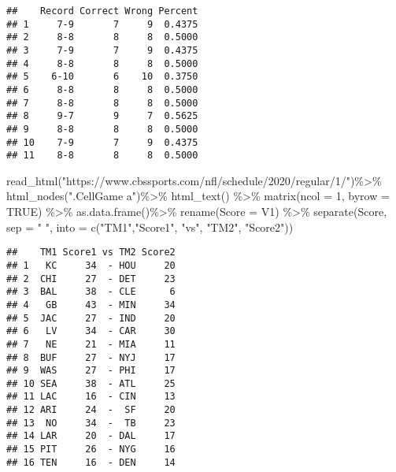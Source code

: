 \documentclass[
]{article}
\newenvironment{Shaded}{\begin{snugshade}}{\end{snugshade}}
\newcommand{\AttributeTok}[1]{\textcolor[rgb]{0.77,0.63,0.00}{#1}}
\newcommand{\ConstantTok}[1]{\textcolor[rgb]{0.00,0.00,0.00}{#1}}
\newcommand{\DecValTok}[1]{\textcolor[rgb]{0.00,0.00,0.81}{#1}}
\newcommand{\FunctionTok}[1]{\textcolor[rgb]{0.00,0.00,0.00}{#1}}
\newcommand{\NormalTok}[1]{#1}
\newcommand{\OtherTok}[1]{\textcolor[rgb]{0.56,0.35,0.01}{#1}}
\newcommand{\SpecialCharTok}[1]{\textcolor[rgb]{0.00,0.00,0.00}{#1}}
\newcommand{\StringTok}[1]{\textcolor[rgb]{0.31,0.60,0.02}{#1}}
\begin{document}
\begin{verbatim}
##    Record Correct Wrong Percent
## 1     7-9       7     9  0.4375
## 2     8-8       8     8  0.5000
## 3     7-9       7     9  0.4375
## 4     8-8       8     8  0.5000
## 5    6-10       6    10  0.3750
## 6     8-8       8     8  0.5000
## 7     8-8       8     8  0.5000
## 8     9-7       9     7  0.5625
## 9     8-8       8     8  0.5000
## 10    7-9       7     9  0.4375
## 11    8-8       8     8  0.5000
\end{verbatim}

\begin{Shaded}
\begin{Highlighting}[]
\FunctionTok{read\_html}\NormalTok{(}\StringTok{"https://www.cbssports.com/nfl/schedule/2020/regular/1/"}\NormalTok{)}\SpecialCharTok{\%\textgreater{}\%}
    \FunctionTok{html\_nodes}\NormalTok{(}\StringTok{".CellGame a"}\NormalTok{)}\SpecialCharTok{\%\textgreater{}\%}
    \FunctionTok{html\_text}\NormalTok{() }\SpecialCharTok{\%\textgreater{}\%} 
    \FunctionTok{matrix}\NormalTok{(}\AttributeTok{ncol =} \DecValTok{1}\NormalTok{, }\AttributeTok{byrow =} \ConstantTok{TRUE}\NormalTok{) }\SpecialCharTok{\%\textgreater{}\%}
    \FunctionTok{as.data.frame}\NormalTok{()}\SpecialCharTok{\%\textgreater{}\%}
    \FunctionTok{rename}\NormalTok{(}\StringTok{\textasciigrave{}}\AttributeTok{Score}\StringTok{\textasciigrave{}} \OtherTok{=}\NormalTok{ V1) }\SpecialCharTok{\%\textgreater{}\%} 
    \FunctionTok{separate}\NormalTok{(Score, }\AttributeTok{sep =} \StringTok{" "}\NormalTok{, }\AttributeTok{into =} \FunctionTok{c}\NormalTok{(}\StringTok{"TM1"}\NormalTok{,}\StringTok{"Score1"}\NormalTok{, }\StringTok{"vs"}\NormalTok{, }\StringTok{"TM2"}\NormalTok{, }\StringTok{"Score2"}\NormalTok{))}
\end{Highlighting}
\end{Shaded}

\begin{verbatim}
##    TM1 Score1 vs TM2 Score2
## 1   KC     34  - HOU     20
## 2  CHI     27  - DET     23
## 3  BAL     38  - CLE      6
## 4   GB     43  - MIN     34
## 5  JAC     27  - IND     20
## 6   LV     34  - CAR     30
## 7   NE     21  - MIA     11
## 8  BUF     27  - NYJ     17
## 9  WAS     27  - PHI     17
## 10 SEA     38  - ATL     25
## 11 LAC     16  - CIN     13
## 12 ARI     24  -  SF     20
## 13  NO     34  -  TB     23
## 14 LAR     20  - DAL     17
## 15 PIT     26  - NYG     16
## 16 TEN     16  - DEN     14
\end{verbatim}
\end{document}
